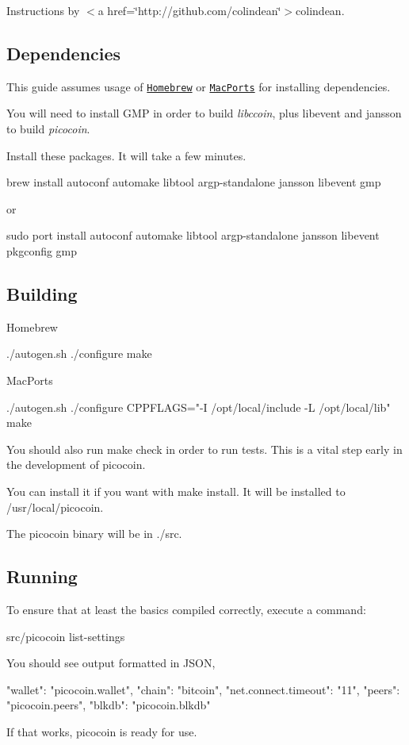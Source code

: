 Instructions by $<$a href=\char`\"{}http\-://github.\-com/colindean\char`\"{}$>$colindean.

\subsection*{Dependencies }

This guide assumes usage of \href{http://brew.sh}{\tt Homebrew} or \href{https://www.macports.org}{\tt Mac\-Ports} for installing dependencies.

You will need to install {\ttfamily G\-M\-P} in order to build {\itshape libccoin}, plus {\ttfamily libevent} and {\ttfamily jansson} to build {\itshape picocoin}.

Install these packages. It will take a few minutes. \begin{DoxyVerb}brew install autoconf automake libtool argp-standalone jansson libevent gmp
\end{DoxyVerb}


or \begin{DoxyVerb}sudo port install autoconf automake libtool argp-standalone jansson libevent pkgconfig gmp
\end{DoxyVerb}


\subsection*{Building }

Homebrew \begin{DoxyVerb}./autogen.sh
./configure
make
\end{DoxyVerb}


Mac\-Ports \begin{DoxyVerb}./autogen.sh
./configure CPPFLAGS="-I /opt/local/include -L /opt/local/lib"
make
\end{DoxyVerb}


You should also run {\ttfamily make check} in order to run tests. This is a vital step early in the development of {\ttfamily picocoin}.

You can install it if you want with {\ttfamily make install}. It will be installed to {\ttfamily /usr/local/picocoin}.

The {\ttfamily picocoin} binary will be in {\ttfamily ./src}.

\subsection*{Running }

To ensure that at least the basics compiled correctly, execute a command\-: \begin{DoxyVerb}src/picocoin list-settings
\end{DoxyVerb}


You should see output formatted in J\-S\-O\-N, \begin{DoxyVerb}{
  "wallet": "picocoin.wallet",
  "chain": "bitcoin",
  "net.connect.timeout": "11",
  "peers": "picocoin.peers",
  "blkdb": "picocoin.blkdb"
}
\end{DoxyVerb}


If that works, {\ttfamily picocoin} is ready for use. 